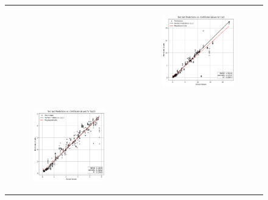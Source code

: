 \begin{figure}
{\begin{tabular}{cc}
\begin{subfigure}{0.5\textwidth}
            \end{subfigure} & \hspace{3cm}
            \begin{subfigure}{0.5\textwidth}
                \includegraphics[width=\textwidth]{images/one_to_one/svr/CaO.png}
            \end{subfigure} \\
            \begin{subfigure}{0.5\textwidth}
                \includegraphics[width=\textwidth]{images/one_to_one/svr/Na2O.png}

\end{subfigure}
\end{tabular}}
\end{figure}
